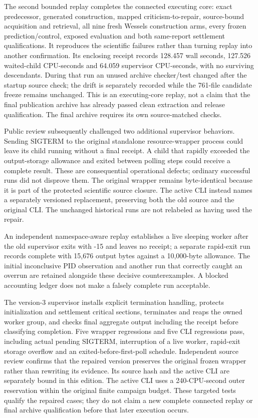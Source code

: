 \documentclass[
  10pt,
]{article}
\begin{document}
The second bounded replay completes the connected executing core: exact
predecessor, generated construction, mapped criticism-to-repair,
source-bound acquisition and retrieval, all nine fresh Wessels
construction arms, every frozen prediction/control, exposed evaluation
and both same-report settlement qualifications. It reproduces the
scientific failures rather than turning replay into another
confirmation. Its enclosing receipt records 128.457 wall seconds,
127.526 waited-child CPU-seconds and 64.059 supervisor CPU-seconds, with
no surviving descendants. During that run an unused archive checker/test
changed after the startup source check; the drift is separately recorded
while the 761-file candidate freeze remains unchanged. This is an
executing-core replay, not a claim that the final publication archive
has already passed clean extraction and release qualification. The final
archive requires its own source-matched checks.

Public review subsequently challenged two additional supervisor
behaviors. Sending SIGTERM to the original standalone resource-wrapper
process could leave its child running without a final receipt. A child
that rapidly exceeded the output-storage allowance and exited between
polling steps could receive a complete result. These are consequential
operational defects; ordinary successful runs did not disprove them. The
original wrapper remains byte-identical because it is part of the
protected scientific source closure. The active CLI instead names a
separately versioned replacement, preserving both the old source and the
original CLI. The unchanged historical runs are not relabeled as having
used the repair.

An independent namespace-aware replay establishes a live sleeping worker
after the old supervisor exits with -15 and leaves no receipt; a
separate rapid-exit run records complete with 15,676 output bytes
against a 10,000-byte allowance. The initial inconclusive PID
observation and another run that correctly caught an overrun are
retained alongside these decisive counterexamples. A blocked accounting
ledger does not make a falsely complete run acceptable.

The version-3 supervisor installs explicit termination handling,
protects initialization and settlement critical sections, terminates and
reaps the owned worker group, and checks final aggregate output
including the receipt before classifying completion. Five wrapper
regressions and five CLI regressions pass, including actual pending
SIGTERM, interruption of a live worker, rapid-exit storage overflow and
an exited-before-first-poll schedule. Independent source review confirms
that the repaired version preserves the original frozen wrapper rather
than rewriting its evidence. Its source hash and the active CLI are
separately bound in this edition. The active CLI uses a 240-CPU-second
outer reservation within the original finite campaign budget. These
targeted tests qualify the repaired cases; they do not claim a new
complete connected replay or final archive qualification before that
later execution occurs.
\end{document}
